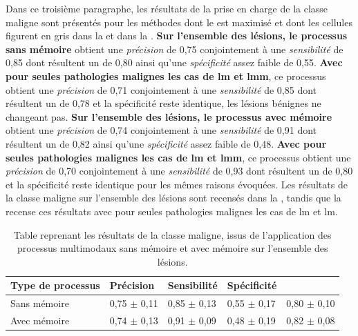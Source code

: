 Dans ce troisième paragraphe, les résultats de la prise en charge de la classe maligne sont présentés pour les méthodes dont le \fscore{} est maximisé et dont les cellules figurent en gris dans la  et dans la . \textbf{Sur l'ensemble des lésions, le \textbf{processus sans mémoire}} obtient une \textit{précision} de 0,75 conjointement à une \textit{sensibilité} de 0,85 dont résultent un \fscore{} de 0,80 ainsi qu'une \textit{spécificité} assez faible de 0,55. \textbf{Avec pour seules pathologies malignes les cas de \gls{lm} et \gls{lmm}}, ce processus obtient une \textit{précision} de 0,71 conjointement à une \textit{sensibilité} de 0,85 dont résultent un \fscore{} de 0,78 et la spécificité reste identique, les lésions bénignes ne changeant pas. \textbf{Sur l'ensemble des lésions, le \textbf{processus avec mémoire}} obtient une \textit{précision} de 0,74 conjointement à une \textit{sensibilité} de 0,91 dont résultent un \fscore{} de 0,82 ainsi qu'une \textit{spécificité} assez faible de 0,48. \textbf{Avec pour seules pathologies malignes les cas de \gls{lm} et \gls{lmm}}, ce processus obtient une \textit{précision} de 0,70 conjointement à une \textit{sensibilité} de 0,93 dont résultent un \fscore{} de 0,80 et la spécificité reste identique pour les mêmes raisons évoquées. Les résultats de la classe maligne sur l'ensemble des lésions sont recensés dans la , tandis que la  recense ces résultats avec pour seules pathologies malignes les cas de \gls{lm} et \gls{lm}.\par

\begin{table}[H]
    \centering
    \begin{tabular}{lllll}
        \toprule 
        Type de processus   & Précision             & Sensibilité           & Spécificité           & \Fscore{}             \\ \midrule
        Sans mémoire        & 0,75 $\pm$ 0,11 	    & 0,85 $\pm$ 0,13 	    & 0,55 $\pm$ 0,17 	    & 0,80 $\pm$ 0,10         \\ \midrule
        Avec mémoire        & 0,74 $\pm$ 0,13 	    & 0,91 $\pm$ 0,09 	    & 0,48 $\pm$ 0,19 	    & 0,82 $\pm$ 0,08         \\ \bottomrule
    \end{tabular}
    \caption{Table reprenant les résultats de la classe maligne, issus de l'application des processus multimodaux sans mémoire et avec mémoire sur l'ensemble des lésions.}
    \label{tab:results_multimodal_process_malignant}
\end{table}

